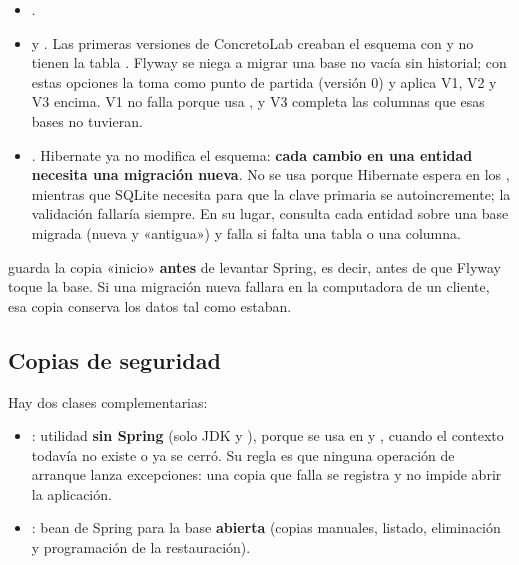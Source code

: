 \begin{itemize}
	\item {}.
	\item {} y . Las primeras versiones
	      de ConcretoLab creaban el esquema con  y no tienen la tabla
	      . Flyway se niega a migrar una base no vacía sin historial; con estas opciones la
	      toma como punto de partida (versión 0) y aplica V1, V2 y V3 encima. V1 no falla porque usa
	      , y V3 completa las columnas que esas bases no tuvieran.
	\item {}. Hibernate ya no modifica el esquema: \textbf{cada cambio en una
	      entidad necesita una migración nueva}. No se usa  porque Hibernate espera  en los
	      , mientras que SQLite necesita  para que la clave primaria se autoincremente; la validación
	      fallaría siempre. En su lugar,  consulta cada entidad sobre una base migrada (nueva
	      y «antigua») y falla si falta una tabla o una columna.
\end{itemize}

\begin{advertencia}
 guarda la copia «inicio» \textbf{antes} de levantar Spring, es decir, antes de que
Flyway toque la base. Si una migración nueva fallara en la computadora de un cliente, esa copia conserva los datos tal
como estaban.
\end{advertencia}

\subsection{Copias de seguridad}
\label{sec:bd-copias}

Hay dos clases complementarias:

\begin{itemize}
	\item {}: utilidad \textbf{sin Spring} (solo JDK y ), porque se usa en
	       y , cuando el contexto todavía no existe o ya se cerró. Su regla es que ninguna
	      operación de arranque lanza excepciones: una copia que falla se registra y no impide abrir la aplicación.
	\item {}: bean de Spring para la base \textbf{abierta} (copias manuales, listado, eliminación y
	      programación de la restauración).
\end{itemize}

